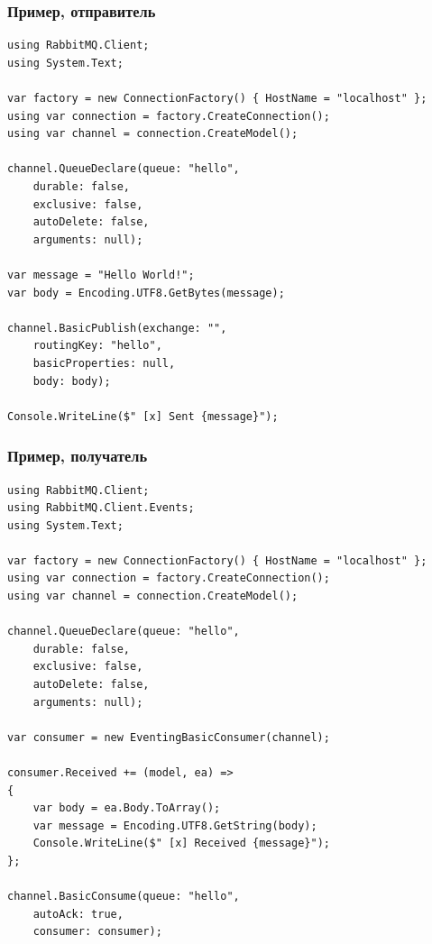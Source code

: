 \documentclass{../../slides-style}
\begin{document}
    \begin{frame}[fragile]
        \frametitle{Пример, отправитель}
        \begin{ssmall}
            \begin{verbatim}
using RabbitMQ.Client;
using System.Text;

var factory = new ConnectionFactory() { HostName = "localhost" };
using var connection = factory.CreateConnection();
using var channel = connection.CreateModel();

channel.QueueDeclare(queue: "hello",
    durable: false,
    exclusive: false,
    autoDelete: false,
    arguments: null);

var message = "Hello World!";
var body = Encoding.UTF8.GetBytes(message);

channel.BasicPublish(exchange: "",
    routingKey: "hello",
    basicProperties: null,
    body: body);

Console.WriteLine($" [x] Sent {message}");
            \end{verbatim}
        \end{ssmall}
    \end{frame}

    \begin{frame}[fragile]
        \frametitle{Пример, получатель}
        \begin{ssmall}
            \begin{verbatim}
using RabbitMQ.Client;
using RabbitMQ.Client.Events;
using System.Text;

var factory = new ConnectionFactory() { HostName = "localhost" };
using var connection = factory.CreateConnection();
using var channel = connection.CreateModel();

channel.QueueDeclare(queue: "hello",
    durable: false,
    exclusive: false,
    autoDelete: false,
    arguments: null);

var consumer = new EventingBasicConsumer(channel);

consumer.Received += (model, ea) =>
{
    var body = ea.Body.ToArray();
    var message = Encoding.UTF8.GetString(body);
    Console.WriteLine($" [x] Received {message}");
};

channel.BasicConsume(queue: "hello",
    autoAck: true,
    consumer: consumer);
            \end{verbatim}
        \end{ssmall}
    \end{frame}
\end{document}
